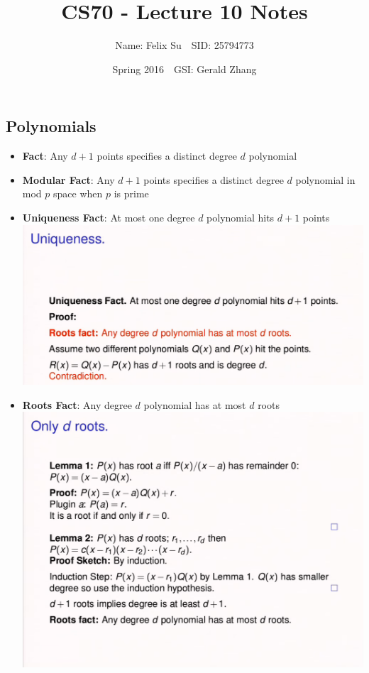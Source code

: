 \documentclass{article}\usepackage{amsmath,amssymb,amsthm,tikz,tkz-graph,color,chngpage,soul,hyperref,csquotes,graphicx,floatrow}\newcommand*{\QEDB}{\hfill\ensuremath{\square}}\newtheorem*{prop}{Proposition}\renewcommand{\theenumi}{\alph{enumi}}\usepackage[shortlabels]{enumitem}\usepackage[nobreak=true]{mdframed}\usetikzlibrary{matrix,calc}\MakeOuterQuote{"}\usepackage[margin=0.75in]{geometry} \newtheorem{theorem}{Theorem}
\title{CS70 - Lecture 10 Notes}
\author{Name: Felix Su$\quad$SID: 25794773}
\date{Spring 2016$\quad$GSI: Gerald Zhang}
\begin{document}
\maketitle

\subsection*{Polynomials}
\begin{itemize}
    \item \textbf{Fact}: Any $d+1$ points specifies a distinct degree $d$ polynomial 
    \item \textbf{Modular Fact}: Any $d+1$ points specifies a distinct degree $d$ polynomial in mod $p$ space when $p$ is prime
    \item \textbf{Uniqueness Fact}: At most one degree $d$ polynomial hits $d+1$ points\\
    \includegraphics{uniquefact}
    \item \textbf{Roots Fact}: Any degree $d$ polynomial has at most $d$ roots\\
    \includegraphics{rootsfact}
\end{itemize}
\end{document}
